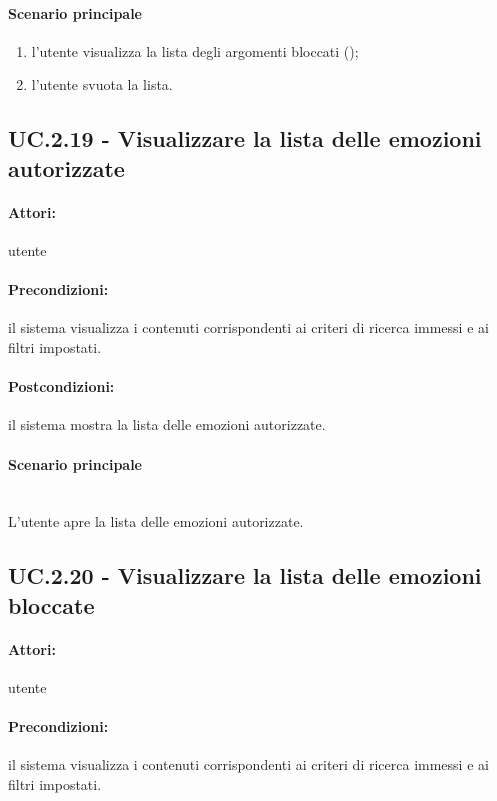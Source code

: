 \documentclass[10pt,a4paper,headinclude,footinclude,hidelinks]{scrreprt} %
\begin{document}
	\paragraph{Scenario principale}
	\begin{enumerate}
	\item l'utente visualizza la lista degli argomenti bloccati ();
	\item l'utente svuota la lista.
	\end{enumerate}

	\subsection[UC.2.19]{UC.2.19 - Visualizzare la lista delle emozioni autorizzate}
	\label{sec:stage:ar:uc:2_19}
	\paragraph{Attori:} utente
	\paragraph{Precondizioni:} il sistema visualizza i contenuti corrispondenti ai criteri di ricerca immessi e ai filtri impostati.
	\paragraph{Postcondizioni:} il sistema mostra la lista delle emozioni autorizzate.
	\paragraph{Scenario principale} \hfill \\
	L'utente apre la lista delle emozioni autorizzate.

	\subsection[UC.2.20]{UC.2.20 - Visualizzare la lista delle emozioni bloccate}
	\label{sec:stage:ar:uc:2_20}
	\paragraph{Attori:} utente
	\paragraph{Precondizioni:} il sistema visualizza i contenuti corrispondenti ai criteri di ricerca immessi e ai filtri impostati.
\end{document}
